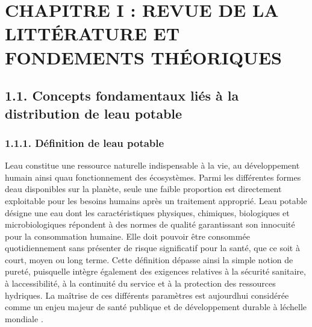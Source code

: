 \documentclass[12pt,a4paper,oneside]{report}
\begin{document}
\section{}\label{section}

\section{CHAPITRE I : REVUE DE LA LITTÉRATURE ET FONDEMENTS
THÉORIQUES}\label{chapitre-i-revue-de-la-littuxe9rature-et-fondements-thuxe9oriques}

\subsection{1.1. Concepts fondamentaux liés à la distribution de
l\textquotesingle eau
potable}\label{concepts-fondamentaux-liuxe9s-uxe0-la-distribution-de-leau-potable}

\subsubsection{1.1.1. Définition de l\textquotesingle eau
potable}\label{duxe9finition-de-leau-potable}

L\textquotesingle eau constitue une ressource naturelle indispensable à
la vie, au développement humain ainsi qu\textquotesingle au
fonctionnement des écosystèmes. Parmi les différentes formes
d\textquotesingle eau disponibles sur la planète, seule une faible
proportion est directement exploitable pour les besoins humains après un
traitement approprié. L\textquotesingle eau potable désigne une eau dont
les caractéristiques physiques, chimiques, biologiques et
microbiologiques répondent à des normes de qualité garantissant son
innocuité pour la consommation humaine. Elle doit pouvoir être consommée
quotidiennement sans présenter de risque significatif pour la santé, que
ce soit à court, moyen ou long terme. Cette définition dépasse ainsi la
simple notion de pureté, puisqu\textquotesingle elle intègre également
des exigences relatives à la sécurité sanitaire, à
l\textquotesingle accessibilité, à la continuité du service et à la
protection des ressources hydriques. La maîtrise de ces différents
paramètres est aujourd\textquotesingle hui considérée comme un enjeu
majeur de santé publique et de développement durable à
l\textquotesingle échelle mondiale \cite{ref4}.
\end{document}
